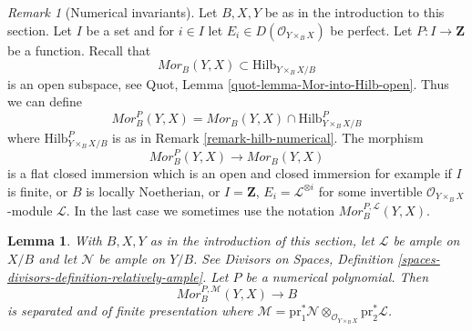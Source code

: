 \documentclass{stacks-project}
\theoremstyle{plain}
\newtheorem{lemma}[subsection]{Lemma}
\theoremstyle{definition}
\theoremstyle{remark}
\newtheorem{remark}[subsection]{Remark}
\numberwithin{equation}{subsection}
\def\Hilbfunctor{\mathrm{Hilb}}
\begin{document}
\begin{remark}[Numerical invariants]
\label{remark-Mor-numerical}
Let $B, X, Y$ be as in the introduction to this section.
Let $I$ be a set and for $i \in I$ let
$E_i \in D(\mathcal{O}_{Y \times_B X})$ be perfect.
Let $P : I \to \mathbf{Z}$ be a function. Recall that
$$
\mathit{Mor}_B(Y, X) \subset
\Hilbfunctor_{Y \times_B X/B}
$$
is an open subspace, see Quot, Lemma \ref{quot-lemma-Mor-into-Hilb-open}.
Thus we can define
$$
\mathit{Mor}^P_B(Y, X) =
\mathit{Mor}_B(Y, X) \cap \Hilbfunctor^P_{Y \times_B X/B}
$$
where $\Hilbfunctor^P_{Y \times_B X/B}$ is as in
Remark \ref{remark-hilb-numerical}. The morphism
$$
\mathit{Mor}^P_B(Y, X) \longrightarrow \mathit{Mor}_B(Y, X)
$$
is a flat closed immersion which is an open and closed immersion
for example if $I$ is finite, or $B$ is locally Noetherian, or
$I = \mathbf{Z}$, $E_i = \mathcal{L}^{\otimes i}$
for some invertible $\mathcal{O}_{Y \times_B X}$-module $\mathcal{L}$.
In the last case we sometimes use the notation
$\mathit{Mor}^{P, \mathcal{L}}_B(Y, X)$.
\end{remark}

\begin{lemma}
\label{lemma-Mor-qc-over-base}
With $B, X, Y$ as in the introduction of this section, let
$\mathcal{L}$ be ample on $X/B$ and let $\mathcal{N}$ be ample on $Y/B$.
See Divisors on Spaces, Definition
\ref{spaces-divisors-definition-relatively-ample}.
Let $P$ be a numerical polynomial. Then
$$
\mathit{Mor}^{P, \mathcal{M}}_B(Y, X) \longrightarrow B
$$
is separated and of finite presentation where
$\mathcal{M} = \text{pr}_1^*\mathcal{N}
\otimes_{\mathcal{O}_{Y \times_B X}} \text{pr}_2^*\mathcal{L}$.
\end{lemma}
\end{document}
